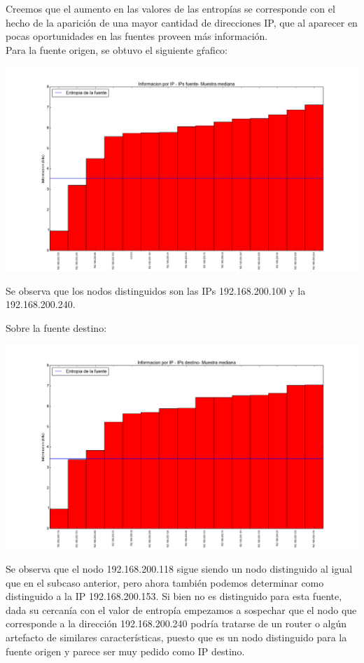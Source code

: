 \indent Creemos que el aumento en las valores de las entropías se corresponde con el hecho de la aparición de una mayor cantidad de direcciones IP, que al aparecer en pocas oportunidades en las fuentes proveen más información.\\
\indent Para la fuente origen, se obtuvo el siguiente gŕafico:\\
\begin{center}
\includegraphics[scale=0.5,clip=true,trim=100 0 0 0]{graphics/laburo_mediana_src.png}
\end{center}

\indent Se observa que los nodos distinguidos son las IPs 192.168.200.100 y la 192.168.200.240.

\indent Sobre la fuente destino:\\
\begin{center}
\includegraphics[scale=0.5,clip=true,trim=100 0 0 0]{graphics/laburo_mediana_dst.png}
\end{center}

\indent  Se observa que el nodo 192.168.200.118 sigue siendo un nodo distinguido al igual que en el subcaso anterior, pero ahora también podemos determinar como distinguido a la IP 192.168.200.153. Si bien no es distinguido para esta fuente, dada su cercanía con el valor de entropía empezamos a sospechar que el nodo que corresponde a la dirección 192.168.200.240 podría tratarse de un router o algún artefacto de similares características, puesto que es un nodo distinguido para la fuente origen y parece ser muy pedido como IP destino.\\

